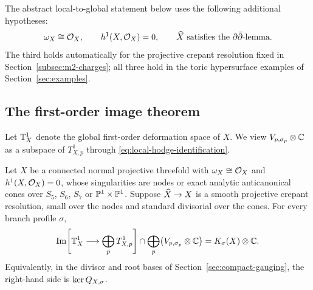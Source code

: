The abstract local-to-global statement below uses the following additional
hypotheses:
\begin{equation}
 \omega_X\cong\mathcal O_X,
 \qquad h^1(X,\mathcal O_X)=0,
 \qquad
 \widehat X\text{ satisfies the }\partial\bar\partial\text{-lemma}.
 \label{eq:global-hypotheses}
\end{equation}
The third holds automatically for the projective crepant resolution fixed
in Section~\ref{subsec:m2-charges}; all three hold in the toric
hypersurface examples of Section~\ref{sec:examples}.

\subsection{The first-order image theorem}
\label{subsec:first-order-theorem}

Let $\mathbb T^1_X$ denote the global first-order deformation space of $X$. We
view $V_{p,\sigma_p}\otimes\mathbb C$ as a subspace of $T^1_{X,p}$ through
\eqref{eq:local-hodge-identification}.

\begin{theorem}
\label{thm:first-order-image}
Let $X$ be a connected normal projective threefold with
$\omega_X\cong\mathcal O_X$ and $h^1(X,\mathcal O_X)=0$, whose singularities are
nodes or exact analytic anticanonical cones over $S_5$, $S_6$, $S_7$
or $\mathbb P^1\times\mathbb P^1$. Suppose $\widehat X\to X$ is a smooth projective
crepant resolution, small over the nodes and standard divisorial over
the cones. For every branch profile $\sigma$,
\begin{equation}
 \operatorname{Im}\!\left[
   \mathbb T^1_X\longrightarrow\bigoplus_pT^1_{X,p}
 \right]
 \cap\bigoplus_p\bigl(V_{p,\sigma_p}\otimes\mathbb C\bigr)
 =K_{\sigma}(X)\otimes\mathbb C.
 \label{eq:first-order-image-theorem}
\end{equation}
Equivalently, in the divisor and root bases of
Section~\ref{sec:compact-gauging}, the right-hand side is
$\ker Q_{X,\sigma}$.
\end{theorem}

